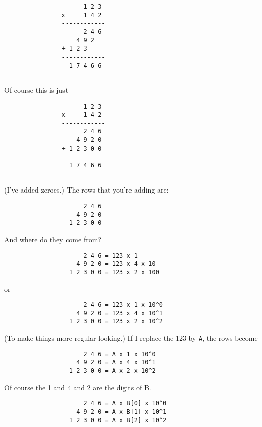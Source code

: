 \begin{Verbatim}
                      1 2 3
                x     1 4 2
                ------------
                      2 4 6
                    4 9 2
                + 1 2 3
                ------------
                  1 7 4 6 6
                ------------
\end{Verbatim}

Of course this is just

\begin{Verbatim}
                      1 2 3
                x     1 4 2
                ------------
                      2 4 6
                    4 9 2 0
                + 1 2 3 0 0
                ------------
                  1 7 4 6 6
                ------------
\end{Verbatim}

(I've added zeroes.) The rows that you're adding are:

\begin{Verbatim}
                      2 4 6
                    4 9 2 0
                  1 2 3 0 0
\end{Verbatim}

And where do they come from?

\begin{Verbatim}
                      2 4 6 = 123 x 1
                    4 9 2 0 = 123 x 4 x 10
                  1 2 3 0 0 = 123 x 2 x 100
\end{Verbatim}

or

\begin{Verbatim}
                      2 4 6 = 123 x 1 x 10^0
                    4 9 2 0 = 123 x 4 x 10^1
                  1 2 3 0 0 = 123 x 2 x 10^2
\end{Verbatim}

(To make things more regular looking.) If I replace the 123 by \verb!A!, 
the rows become

\begin{Verbatim}
                      2 4 6 = A x 1 x 10^0
                    4 9 2 0 = A x 4 x 10^1
                  1 2 3 0 0 = A x 2 x 10^2
\end{Verbatim}

Of course the 1 and 4 and 2 are the digits of B.

\begin{Verbatim}
                      2 4 6 = A x B[0] x 10^0
                    4 9 2 0 = A x B[1] x 10^1
                  1 2 3 0 0 = A x B[2] x 10^2
\end{Verbatim}

